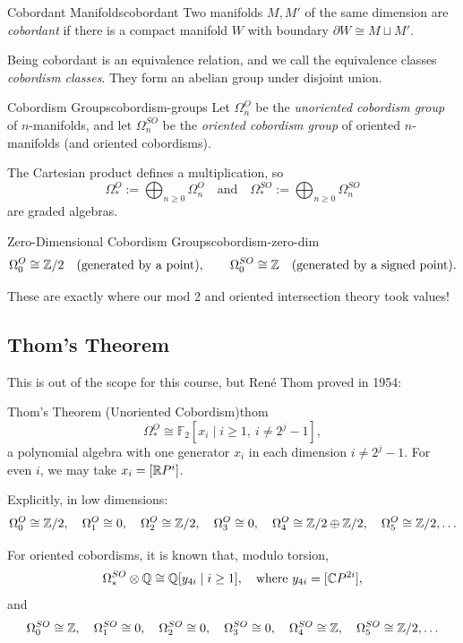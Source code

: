 \begin{definition}{Cobordant Manifolds}{cobordant}
    Two manifolds $M, M'$ of the same dimension are \emph{cobordant} if there is a compact manifold $W$ with boundary $\partial W \cong M \sqcup M'$.
\end{definition}

Being cobordant is an equivalence relation, and we call the equivalence classes \emph{cobordism classes}. They form an abelian group under disjoint union.

\begin{definition}{Cobordism Groups}{cobordism-groups}
    Let $\Omega_n^O$ be the \emph{unoriented cobordism group} of $n$-manifolds, and let $\Omega_n^{SO}$ be the \emph{oriented cobordism group} of oriented $n$-manifolds (and oriented cobordisms).
\end{definition}

The Cartesian product defines a multiplication, so
\[
    \Omega_*^O := \bigoplus_{n \geq 0} \Omega_n^O \quad \text{and} \quad \Omega_*^{SO} := \bigoplus_{n \geq 0} \Omega_n^{SO}
\]
are graded algebras.

\begin{example}{Zero-Dimensional Cobordism Groups}{cobordism-zero-dim}
    \[
        \Omega_0^O \cong \mathbb{Z}/2 \quad (\text{generated by a point}), \qquad \Omega_0^{SO} \cong \mathbb{Z} \quad (\text{generated by a signed point}).
    \]
\end{example}

These are exactly where our mod 2 and oriented intersection theory took values!

\subsection{Thom's Theorem}

This is out of the scope for this course, but Ren\'e Thom proved in 1954:

\begin{theorem}{Thom's Theorem (Unoriented Cobordism)}{thom}
    \[
        \Omega_*^O \cong \mathbb{F}_2[x_i \mid i \geq 1,\ i \neq 2^j - 1],
    \]
    a polynomial algebra with one generator $x_i$ in each dimension $i \neq 2^j - 1$. For even $i$, we may take $x_i = [\mathbb{R} P^i]$.
\end{theorem}

Explicitly, in low dimensions:
\[
    \Omega_0^O \cong \mathbb{Z}/2, \quad \Omega_1^O \cong 0, \quad \Omega_2^O \cong \mathbb{Z}/2, \quad \Omega_3^O \cong 0, \quad \Omega_4^O \cong \mathbb{Z}/2 \oplus \mathbb{Z}/2, \quad \Omega_5^O \cong \mathbb{Z}/2, \ldots
\]

For oriented cobordisms, it is known that, modulo torsion,
\[
    \Omega_*^{SO} \otimes \mathbb{Q} \cong \mathbb{Q}[y_{4i} \mid i \geq 1], \quad \text{where } y_{4i} = [\mathbb{C} P^{2i}],
\]
and
\[
    \Omega_0^{SO} \cong \mathbb{Z}, \quad \Omega_1^{SO} \cong 0, \quad \Omega_2^{SO} \cong 0, \quad \Omega_3^{SO} \cong 0, \quad \Omega_4^{SO} \cong \mathbb{Z}, \quad \Omega_5^{SO} \cong \mathbb{Z}/2, \ldots
\]
